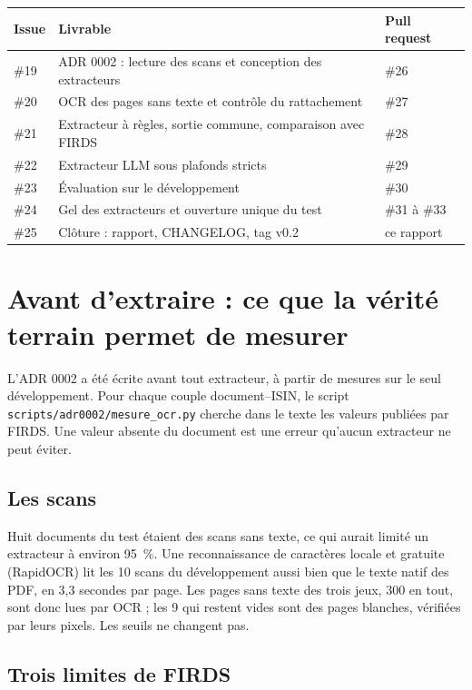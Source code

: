\documentclass[11pt,a4paper]{article}
\begin{document}
\begin{table}[H]
\small
\begin{tabularx}{\linewidth}{lYl}
\toprule
\textbf{Issue} & \textbf{Livrable} & \textbf{Pull request} \\
\midrule
\#19 & ADR 0002 : lecture des scans et conception des extracteurs & \#26 \\
\#20 & OCR des pages sans texte et contrôle du rattachement & \#27 \\
\#21 & Extracteur à règles, sortie commune, comparaison avec FIRDS & \#28 \\
\#22 & Extracteur LLM sous plafonds stricts & \#29 \\
\#23 & Évaluation sur le développement & \#30 \\
\#24 & Gel des extracteurs et ouverture unique du test & \#31 à \#33 \\
\#25 & Clôture : rapport, CHANGELOG, tag v0.2 & ce rapport \\
\bottomrule
\end{tabularx}
\end{table}

\section{Avant d'extraire : ce que la vérité terrain permet de mesurer}

L'ADR 0002 a été écrite avant tout extracteur, à partir de mesures sur le seul développement. Pour chaque couple document--ISIN, le script \texttt{scripts/adr0002/mesure\_ocr.py} cherche dans le texte les valeurs publiées par FIRDS. Une valeur absente du document est une erreur qu'aucun extracteur ne peut éviter.

\subsection{Les scans}

Huit documents du test étaient des scans sans texte, ce qui aurait limité un extracteur à environ 95~\%. Une reconnaissance de caractères locale et gratuite (RapidOCR) lit les 10 scans du développement aussi bien que le texte natif des PDF, en 3,3 secondes par page. Les pages sans texte des trois jeux, 300 en tout, sont donc lues par OCR ; les 9 qui restent vides sont des pages blanches, vérifiées par leurs pixels. Les seuils ne changent pas.

\subsection{Trois limites de FIRDS}
\end{document}

